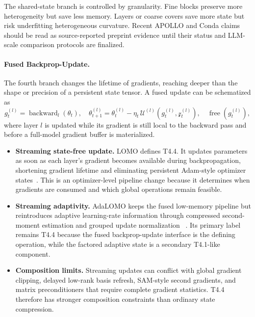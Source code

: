 The shared-state branch is controlled by granularity.  Fine blocks preserve
more heterogeneity but save less memory.  Layers or coarse covers save more
state but risk underfitting heterogeneous curvature.  Recent APOLLO and Conda
claims should be read as source-reported preprint evidence until their status
and LLM-scale comparison protocols are finalized.

\paragraph{Fused Backprop-Update.}
\label{sec:t4-fused}

The fourth branch changes the lifetime of gradients, reaching deeper than the
shape or precision of a persistent state tensor.  A fused update can be
schematized as
\begin{equation}
  g_t^{(l)}=\operatorname{backward}_l(\theta_t),\quad
  \theta_{t+1}^{(l)}
  =
  \theta_t^{(l)}-\eta_t\,\mathcal{U}^{(l)}(g_t^{(l)},\mathcal{z}_t^{(l)}),
  \quad
  \operatorname{free}(g_t^{(l)}),
  \label{eq:t4-fused-template}
\end{equation}
where layer $l$ is updated while its gradient is still local to the backward
pass and before a full-model gradient buffer is materialized.
\begin{itemize}
  \setlength{\itemsep}{2pt}
  \item \textbf{Streaming state-free update.}  LOMO defines T4.4.  It updates
  parameters as soon as each layer's gradient becomes available during
  backpropagation, shortening gradient lifetime and eliminating persistent
  Adam-style optimizer states~\citep{lv2024full}.  This is an optimizer-level
  pipeline change because it determines when gradients are consumed and which
  global operations remain feasible.
  \item \textbf{Streaming adaptivity.}  AdaLOMO keeps the fused low-memory
  pipeline but reintroduces adaptive learning-rate information through
  compressed second-moment estimation and grouped update normalization
  ~\citep{lv2024adalomo}.  Its primary label remains T4.4 because the fused
  backprop-update interface is the defining operation, while the factored adaptive
  state is a secondary T4.1-like component.
  \item \textbf{Composition limits.}  Streaming updates can conflict with
  global gradient clipping, delayed low-rank basis refresh, SAM-style second
  gradients, and matrix preconditioners that require complete gradient
  statistics.  T4.4 therefore has stronger composition constraints than
  ordinary state compression.
\end{itemize}

